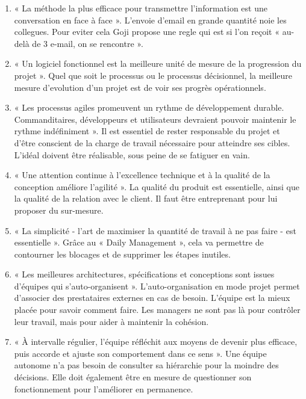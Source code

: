 \documentclass[12pt,a4paper]{article}
\begin{document}
\begin{enumerate}
\item	« La méthode la plus efficace pour transmettre l'information est une conversation en face à face ». L'envoie d'email en grande quantité noie les collegues. Pour eviter cela Goji propose une regle qui est si l'on reçoit « au-delà de 3 e-mail, on se rencontre ».

\item	« Un logiciel fonctionnel est la meilleure unité de mesure de la progression du projet ». Quel que soit le processus ou le processus décisionnel, la meilleure mesure d'evolution d'un projet est de voir ses progrès opérationnels.

\item	« Les processus agiles promeuvent un rythme de développement durable. Commanditaires, développeurs et utilisateurs devraient pouvoir maintenir le rythme indéfiniment ». Il est essentiel de rester responsable du projet et d'être conscient de la charge de travail nécessaire pour atteindre ses cibles. L'idéal doivent être réalisable, sous peine de se fatiguer en vain.

\item	« Une attention continue à l'excellence technique et à la qualité de la conception améliore l'agilité ». La qualité du produit est essentielle, ainsi que la qualité de la relation avec le client. Il faut être entreprenant pour lui proposer du sur-mesure.

\item	« La simplicité - l'art de maximiser la quantité de travail à ne pas faire - est essentielle ». Grâce au « Daily Management », cela va permettre de contourner les blocages et de supprimer les étapes inutiles.

\item	« Les meilleures architectures, spécifications et conceptions sont issues d'équipes qui s'auto-organisent ». L’auto-organisation en mode projet permet d’associer des prestataires externes en cas de besoin. L’équipe est la mieux placée pour savoir comment faire. Les managers ne sont pas là pour contrôler leur travail, mais pour aider à maintenir la cohésion.

\item	« À intervalle régulier, l'équipe réfléchit aux moyens de devenir plus efficace, puis accorde et ajuste son comportement dans ce sens ». Une équipe autonome n’a pas besoin de consulter sa hiérarchie pour la moindre  des décisions. Elle doit également être en mesure de questionner son fonctionnement pour l’améliorer en permanence. \\



\end{enumerate}
\end{document}
